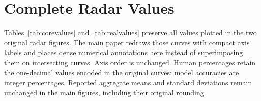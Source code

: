 \documentclass{article}
\begin{document}
\section{Complete Radar Values}\label{sec:values}
Tables~\ref{tab:corevalues} and~\ref{tab:realvalues} preserve all values plotted in the two original radar figures. The main paper redraws those curves with compact axis labels and places dense numerical annotations here instead of superimposing them on intersecting curves. Axis order is unchanged. Human percentages retain the one-decimal values encoded in the original curves; model accuracies are integer percentages. Reported aggregate means and standard deviations remain unchanged in the main figures, including their original rounding.

\let\supplementbibliography\thebibliography
\renewcommand{\thebibliography}[1]{%
  \supplementbibliography{#1}%
  \setlength{\itemsep}{2pt}%
  \setlength{\parsep}{0pt}%
  \setlength{\parskip}{0pt}%
}


\end{document}
